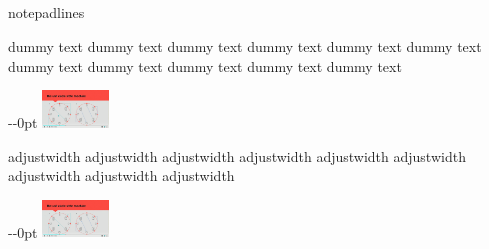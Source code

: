 \documentclass[../../main.tex]{subfiles}
\begin{document}
\checkoddpage\ifoddpage 
  \else 
    \hspace*{-\marginparsep-\marginparwidth}
  \fi%
\noindent\makebox{\rule{\linewidth}{0.1pt}}\\
\checkoddpage\ifoddpage 
  \else 
    \hspace*{-\marginparsep-\marginparwidth}
  \fi%
\noindent\makebox{\rule{\textwidth}{0.5pt}}\\
\checkoddpage\ifoddpage 
  \else 
    \hspace*{-\marginparsep-\marginparwidth}
  \fi%
\noindent\makebox{\rule{\textwidth+\marginparsep}{1.pt}}\\
\checkoddpage\ifoddpage 
  \else 
    \hspace*{-\marginparsep-\marginparwidth}
  \fi%
\noindent\makebox{\rule{\textwidth+\marginparsep+\marginparwidth}{1.5pt}}\\
\checkoddpage\ifoddpage 
  \else 
    \hspace*{-\marginparsep-\marginparwidth}
  \fi%
\hspace*{-1.1in}%
\noindent\makebox{\rule{\paperwidth}{2.0pt}}

notepadlines

\notepadlines[7]

\checkoddpage\ifoddpage 
    \def\xoff{0in}
  \else 
    \def\xoff{-\marginparsep-\marginparwidth}
  \fi
\noindent dummy text dummy text dummy text dummy text dummy text dummy text dummy text dummy text dummy text dummy text dummy text
\begin{adjustwidth}{\xoff}{0pt}
\includegraphics[width=\textwidth+\marginparsep+\marginparwidth, height=1cm]{./img/statemachineXH.png}
\end{adjustwidth}

\clearpage
\noindent adjustwidth adjustwidth adjustwidth adjustwidth adjustwidth adjustwidth adjustwidth adjustwidth adjustwidth
\checkoddpage\ifoddpage 
    \def\xoff{0in}
  \else 
    \def\xoff{-\marginparsep-\marginparwidth}
  \fi
\begin{adjustwidth}{\xoff}{0pt}
\includegraphics[width=\textwidth+\marginparsep+\marginparwidth, height=1cm]{./img/statemachineXH.png}
\end{adjustwidth}
\end{document}
